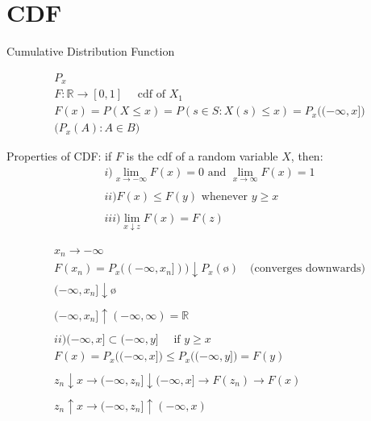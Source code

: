\documentclass[10pt]{article}
\begin{document}
\newpage

\section{CDF}

Cumulative Distribution Function

\begin{align*}
    P_x\\
    F : \mathbb{R} \to [0, 1] \quad\text{ cdf of } X_1\\
    F(x) = P(X \leq x) = P(s \in S : X(s) \leq x) = P_x\big((-\infty, x]\big)\\
    \big(P_x(A) : A \in B\big)
\end{align*}


Properties of CDF:
if $F$ is the cdf of a random variable $X$, then: 
\begin{align*}
    i) \lim_{x \to -\infty} F(x) = 0 \text{ and }\lim_{x \to \infty} F(x) = 1\\
    \\
    ii) F(x) \leq F(y) \text{ whenever } y \geq x\\
    \\
    iii) \lim_{x \downarrow z} F(x) = F(z)
\end{align*}

\begin{align*}
    x_n \to -\infty \\
    F(x_n) = P_x\big((-\infty, x_n])\big) \downarrow P_x(ø) \quad\text{(converges downwards)}\\
    (-\infty, x_n] \downarrow ø\\
    \\
    (-\infty, x_n] \uparrow (-\infty, \infty) = \mathbb{R}\\
    \\
    ii) (-\infty, x] \subset (-\infty, y] \quad\text{ if } y \geq x\\
    F(x) = P_x\big((-\infty, x]\big) \leq P_x\big((-\infty, y]\big) = F(y)\\
    \\
    z_n \downarrow x \to (-\infty, z_n] \downarrow (-\infty, x] \to F(z_n) \to F(x)\\
    \\
    z_n \uparrow x \to (-\infty, z_n] \uparrow (-\infty, x)
\end{align*}
\end{document}
